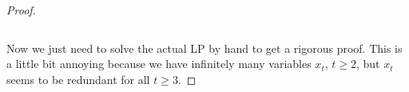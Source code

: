 \documentclass[12pt]{article}
\begin{document}
\begin{proof}
\begin{verbatim}
  \end{verbatim}
  Now we just need to solve the actual LP by hand to get a rigorous proof.  This is a little bit annoying because we have infinitely many variables $x_t$, $t\ge 2$, but $x_t$ seems to be redundant for all $t\ge 3$.
\end{proof}



\end{document}
